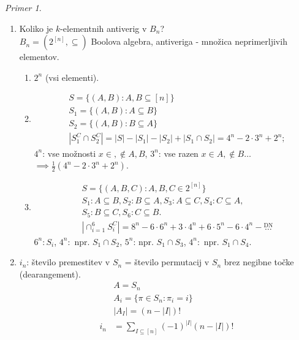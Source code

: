 \documentclass[a4paper, 12pt]{book}
\theoremstyle{definition}
\theoremstyle{remark}
\newtheorem*{ex}{Primer}
\begin{document}
%
%
%
\begin{ex}
  \begin{enumerate}[label=(\arabic{*})] \text{}
    \item Koliko je $k$-elementnih antiverig v $B_n$? \\
      $B_n = (2^{[n]}, \subseteq)$ Boolova algebra, antiveriga - množica neprimerljivih elementov.
      \begin{enumerate}[label={k=\arabic*:}]
        \item $2^n$ (vsi elementi).
        \item 
          \begin{align*}
            &S = \{(A,B): A, B \subseteq [n]\} \\
            &S_1 = \{(A,B): A \subseteq B\} \\
            &S_2 = \{(A,B): B \subseteq A\} \\
            &|S_1^C \cap S_2^C| = |S| - |S_1| - |S_2| + |S_1 \cap S_2| = 4^n - 2 \cdot 3^n + 2^n;
          \end{align*}
          $4^n$: vse možnosti $x \in, \notin A,B$, $3^n$: vse razen $x \in A, \notin B \dots$ \\
          $\implies \frac{1}{2} (4^n - 2 \cdot 3^n + 2^n)$.
        \item
          \begin{align*}
            &S = \{(A,B,C): A,B,C \in 2^{[n]}\} \\
            &S_1: A \subseteq B, S_2: B \subseteq A, S_3: A \subseteq C, S_4: C \subseteq A, \\
            &S_5: B \subseteq C, S_6: C \subseteq B. \\
            &|\cap_{i=1}^6 S_i^C| = 8^n - 6 \cdot 6^n + 3 \cdot 4^n + 6 \cdot 5^n - 6 \cdot 4^n - \stackrel{\text{DN}}{\dots}
          \end{align*}
          $6^n: S_i$, $4^n:$ npr. $S_1 \cap S_2$, $5^n$: npr. $S_1 \cap S_3$, $4^n:$ npr. $S_1 \cap S_4$.
      \end{enumerate}
    \item $i_n$: število premestitev v $S_n$ = število permutacij v $S_n$ brez negibne točke (dearangement).
      \begin{align*}
        &A = S_n \\
        &A_i = \{\pi \in S_n: \pi_i = i\} \\
        &|A_{I}| = (n - |I|)! \\
        i_n &= \sum_{I \subseteq [n]} (-1)^{|I|} (n - |I|)! \\

\end{align*}
\end{enumerate}
\end{ex}
\end{document}
